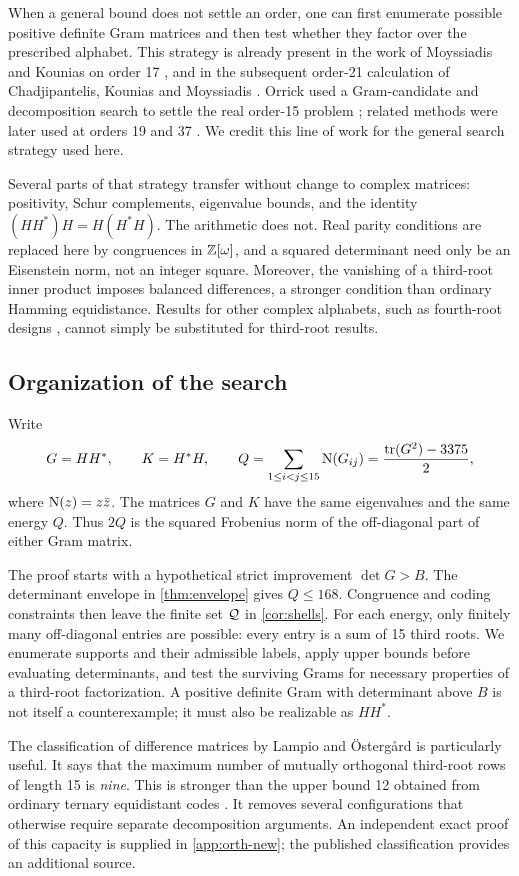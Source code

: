When a general bound does not settle an order, one can first enumerate possible positive definite Gram matrices and then test whether they factor over the prescribed alphabet. This strategy is already present in the work of Moyssiadis and Kounias on order 17 \cite{MK82}, and in the subsequent order-21 calculation of Chadjipantelis, Kounias and Moyssiadis \cite{CKM87}. Orrick used a Gram-candidate and decomposition search to settle the real order-15 problem \cite{Orrick}; related methods were later used at orders 19 and 37 \cite{Brent}. We credit this line of work for the general search strategy used here.

Several parts of that strategy transfer without change to complex matrices: positivity, Schur complements, eigenvalue bounds, and the identity $(HH^*)H=H(H^*H)$. The arithmetic does not. Real parity conditions are replaced here by congruences in $\mathbb Z[\omega]$, and a squared determinant need only be an Eisenstein norm, not an integer square. Moreover, the vanishing of a third-root inner product imposes balanced differences, a stronger condition than ordinary Hamming equidistance. Results for other complex alphabets, such as fourth-root designs \cite{Cohn}, cannot simply be substituted for third-root results.

\subsection{Organization of the search}
Write
\begin{equation}\label{eq:energy}
 G=HH^*,\qquad K=H^*H,\qquad
 Q=\sum_{1\le i<j\le15}\operatorname N(G_{ij})
   =\frac{\operatorname{tr}(G^2)-3375}{2},
\end{equation}
where $\operatorname N(z)=z\bar z$. The matrices $G$ and $K$ have the same eigenvalues and the same energy $Q$. Thus $2Q$ is the squared Frobenius norm of the off-diagonal part of either Gram matrix.

The proof starts with a hypothetical strict improvement $\det G>B$. The determinant envelope in \cref{thm:envelope} gives $Q\le168$. Congruence and coding constraints then leave the finite set $\mathcal Q$ in \cref{cor:shells}. For each energy, only finitely many off-diagonal entries are possible: every entry is a sum of 15 third roots. We enumerate supports and their admissible labels, apply upper bounds before evaluating determinants, and test the surviving Grams for necessary properties of a third-root factorization. A positive definite Gram with determinant above $B$ is not itself a counterexample; it must also be realizable as $HH^*$.

The classification of difference matrices by Lampio and \"Osterg\aa rd \cite{LO} is particularly useful. It says that the maximum number of mutually orthogonal third-root rows of length 15 is \emph{nine}. This is stronger than the upper bound 12 obtained from ordinary ternary equidistant codes \cite{TB}. It removes several configurations that otherwise require separate decomposition arguments. An independent exact proof of this capacity is supplied in \cref{app:orth-new}; the published classification provides an additional source.
